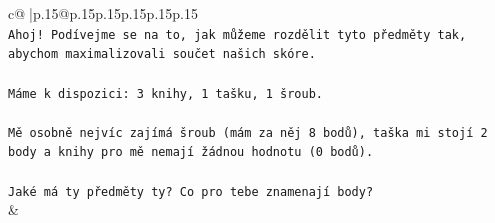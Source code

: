 \documentclass{article}
\begin{document}
{\begin{supertabular}{c@{$\;$}|p{.15\linewidth}@{}p{.15\linewidth}p{.15\linewidth}p{.15\linewidth}p{.15\linewidth}p{.15\linewidth}}
{{{\\ 
\texttt{Ahoj! Podívejme se na to, jak můžeme rozdělit tyto předměty tak, abychom maximalizovali součet našich skóre.} \\
\\ 
\texttt{Máme k dispozici: 3 knihy, 1 tašku, 1 šroub.} \\
\\ 
\texttt{Mě osobně nejvíc zajímá šroub (mám za něj 8 bodů), taška mi stojí 2 body a knihy pro mě nemají žádnou hodnotu (0 bodů).} \\
\\ 
\texttt{Jaké má ty předměty ty? Co pro tebe znamenají body?} \\
            }
        }
    }
    & \\ \\


\end{supertabular}}
\end{document}

